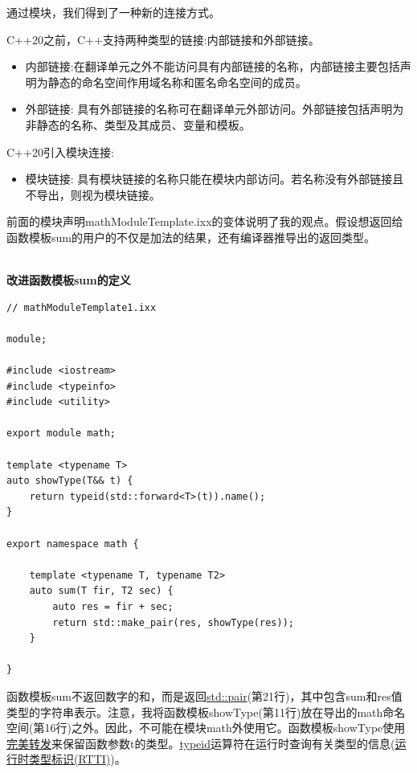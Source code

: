 通过模块，我们得到了一种新的连接方式。


C++20之前，C++支持两种类型的链接:内部链接和外部链接。

\begin{itemize}
\item 
内部链接:在翻译单元之外不能访问具有内部链接的名称，内部链接主要包括声明为静态的命名空间作用域名称和匿名命名空间的成员。

\item 
外部链接: 具有外部链接的名称可在翻译单元外部访问。外部链接包括声明为非静态的名称、类型及其成员、变量和模板。
\end{itemize}

C++20引入模块连接:

\begin{itemize}
\item 
模块链接: 具有模块链接的名称只能在模块内部访问。若名称没有外部链接且不导出，则视为模块链接。
\end{itemize}

前面的模块声明mathModuleTemplate.ixx的变体说明了我的观点。假设想返回给函数模板sum的用户的不仅是加法的结果，还有编译器推导出的返回类型。

\hspace*{\fill} \\ %
\noindent
\textbf{改进函数模板sum的定义}
\begin{lstlisting}[style=styleCXX]
// mathModuleTemplate1.ixx

module;

#include <iostream>
#include <typeinfo>
#include <utility>

export module math;

template <typename T>
auto showType(T&& t) {
	return typeid(std::forward<T>(t)).name();
}

export namespace math {

	template <typename T, typename T2>
	auto sum(T fir, T2 sec) {
		auto res = fir + sec;
		return std::make_pair(res, showType(res));
	}

}
\end{lstlisting}

函数模板sum不返回数字的和，而是返回\href{https://en.cppreference.com/w/cpp/utility/pair}{std::pair}(第21行)，其中包含sum和res值类型的字符串表示。注意，我将函数模板showType(第11行)放在导出的math命名空间(第16行)之外。因此，不可能在模块math外使用它。函数模板showType使用\href{https://www.modernescpp.com/index.php/perfect-forwarding}{完美转发}来保留函数参数t的类型。\href{https://en.cppreference.com/w/cpp/language/typeid}{typeid}运算符在运行时查询有关类型的信息(\href{https://en.cppreference.com/w/cpp/types}{运行时类型标识(RTTI)})。

